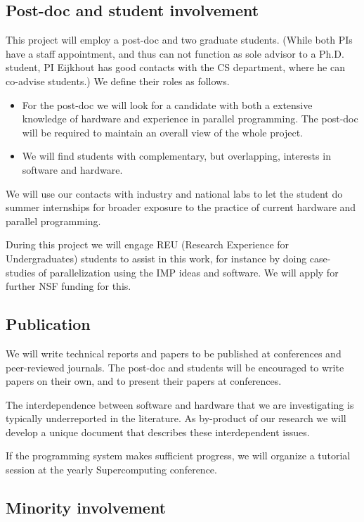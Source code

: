 \subsection{Post-doc and student involvement}

This project will employ a post-doc and two
graduate students. (While both PIs have a staff appointment,
and thus can not function as sole advisor to a Ph.D. student,
PI Eijkhout has good contacts with the CS department,
where he can co-advise students.)
We define their roles as follows.
\begin{itemize}
\item For the post-doc we will look for a candidate with both a
  extensive knowledge of hardware and experience in parallel programming.
  The post-doc will be required to maintain an overall view
  of the whole project.
\item We will find students with complementary, but overlapping,
  interests in software and hardware.
\end{itemize}
We will use our contacts with industry and national labs to let the 
student do summer internships for broader exposure to 
the practice of current hardware and parallel programming.

During this project we will engage REU (Research Experience for Undergraduates)
students to assist in this work, for instance by doing case-studies of
parallelization using the \ac{IMP} ideas and software.
We will apply for further NSF funding for this.

\subsection{Publication}

We will write technical reports and papers to be published at
conferences and peer-reviewed journals.  The post-doc and students will be
encouraged to write papers on their own, and to present their papers
at conferences.

The interdependence between software and hardware
that we are investigating
is typically underreported in the literature. As by-product of our research
we will develop a unique document that describes these interdependent
issues.

If the programming system makes sufficient progress, we will organize a tutorial
session at the yearly Supercomputing conference.

\subsection{Minority involvement}

